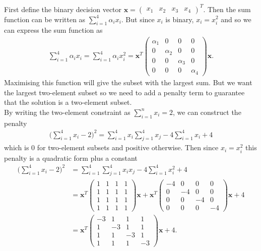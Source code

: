 \documentclass{article}
\begin{document}
\noindent First define the binary decision vector \(\mathbf{x} = \begin{pmatrix}
	x_1 & x_2 & x_3 & x_4
	\end{pmatrix}^T\). 
Then the sum function can be written as \(\sum_{i=1}^4 \alpha_i x_i\). But since \(x_i\) is binary, \(x_i = x_i^2\) and so we can express the sum function as
\begin{align*}
\sum_{i=1}^4 \alpha_i x_i = \sum_{i=1}^4 \alpha_i x_i^2 = \mathbf{x}^T\begin{pmatrix}
	\alpha_1 & 0 & 0 & 0 \\
	0 & \alpha_2 & 0 & 0 \\
	0 & 0 & \alpha_3 & 0 \\ 
	0 & 0 & 0 & \alpha_4
\end{pmatrix}\mathbf{x}.
\end{align*} 
\noindent Maximising this function will give the subset with the largest sum. But we want the largest two-element subset so we need to add a penalty term to guarantee that the solution is a two-element subset. \\
By writing the two-element constraint as \(\sum_{i=1}^n x_i = 2\), we can construct the penalty 
\begin{align*}
    \bigg(\sum_{i=1}^4 x_i - 2\bigg)^2 = \sum_{i=1}^4 x_i\sum_{j=1}^4 x_j - 4\sum_{i=1}^4 x_i + 4
\end{align*}
\noindent which is 0 for two-element subsets and positive otherwise. Then since \(x_i = x_i^2\) this penalty is a quadratic form plus a constant
\begin{align*}
	\bigg(\sum_{i=1}^4 x_i - 2\bigg)^2 &= \sum_{i=1}^4\sum_{j=1}^4 x_ix_j - 4\sum_{i=1}^4 x_i^2 + 4 \\
	&= \mathbf{x}^T \begin{pmatrix}
		1 & 1 & 1 & 1 \\
		1 & 1 & 1 & 1 \\
		1 & 1 & 1 & 1 \\
		1 & 1 & 1 & 1
	\end{pmatrix}\mathbf{x} +\mathbf{x}^T \begin{pmatrix}
		-4 & 0 & 0 & 0 \\
		0 & -4 & 0 & 0 \\
		0 & 0 & -4 & 0 \\
		0 & 0 & 0 & -4 
	\end{pmatrix}\mathbf{x} + 4 \\
	&= \mathbf{x}^T \begin{pmatrix}
		-3 & 1 & 1 & 1 \\
		1 & -3 & 1 & 1 \\
		1 & 1 & -3 & 1 \\
		1 & 1 & 1 & -3
	\end{pmatrix} \mathbf{x} + 4.
\end{align*}
\end{document}
